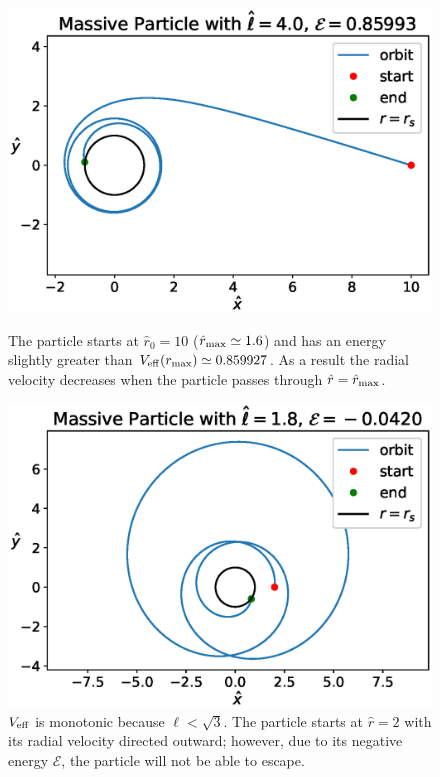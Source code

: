 \begin{figure}[h]
    \begin{minipage}{0.48\textwidth}
        \centering
        \includegraphics[width=\textwidth]{Figures/chapter2/infall1.eps}
        \caption{The particle starts at $\hat r_0 = 10$
        ($\hat r_{\rm max} \simeq 1.6$) and has an energy slightly greater than
        $V_{\rm eff}(r_{\rm max}) \simeq 0.859927$.
        As a result the radial velocity decreases when the particle passes
        through $\hat r = \hat r_{\rm max}$.}
        \label{cap2:fig:infall1}
    \end{minipage}
    \hspace{0.015 \textwidth}
    \begin{minipage}{0.48\textwidth}
        \centering
        \includegraphics[width=\textwidth]{Figures/chapter2/infall2.eps}
        \caption{$V_{\rm eff}$ is monotonic because $\ell < \sqrt{3}$.
        The particle starts at $\hat r = 2$ with its radial velocity
        directed outward; however, due to its negative energy $\mathcal E$, the
        particle will not be able to escape.}
        \label{cap2:fig:infall2}
    \end{minipage}
\end{figure}

